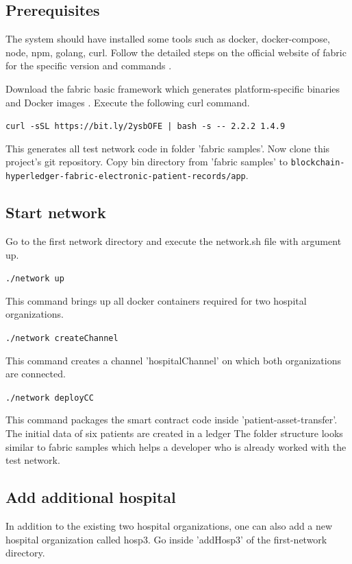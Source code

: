 \subsection{Prerequisites}
The system should have installed some tools such as docker, docker-compose, node, npm, golang, curl. Follow the detailed steps on the official website of fabric for the specific version and commands \cite{prerequisites}.

Download the fabric basic framework which generates platform-specific binaries and Docker images \cite{download-fabric-samples}.
Execute the following curl command.

\lstinline{curl -sSL https://bit.ly/2ysbOFE | bash -s -- 2.2.2 1.4.9}

This generates all test network code in folder 'fabric samples'. Now clone this project's git repository. Copy bin directory from 'fabric samples' to
\lstinline{blockchain-hyperledger-fabric-electronic-patient-records/app}.

\subsection{Start network}
\label{sec:implementation:steps:startnetwork}

Go to the first network directory and execute the network.sh file with argument up. 

\lstinline{./network up} 

This command brings up all docker containers required for two hospital organizations.

\lstinline{./network createChannel} 

This command creates a channel 'hospitalChannel' on which both organizations are connected.

\lstinline{./network deployCC} 

This command packages the smart contract code inside 'patient-asset-transfer'. The initial data of six patients are created in a ledger 
The folder structure looks similar to fabric samples which helps a developer who is already worked with the test network. 

\subsection{Add additional hospital}
\label{sec:implementation:steps:additionalhospital}

In addition to the existing two hospital organizations, one can also add a new hospital organization called hosp3. Go inside 'addHosp3' of the first-network directory.

